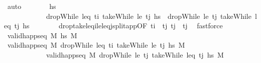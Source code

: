 \begin{isabellebody}
\ auto\isanewline
\ \ \ \ \isamarkupfalse%
\ \isamarkupfalse%
\ {\isachardoublequoteopen}{\isacharquery}{\kern0pt}hs{\isacharprime}{\kern0pt}\ \isanewline
\ \ \ \ \ \ \ \ \ \ \ {\isacharequal}{\kern0pt}\ dropWhile\ {\isacharparenleft}{\kern0pt}leq\ t\isactrlsub i{\isacharparenright}{\kern0pt}\ {\isacharparenleft}{\kern0pt}takeWhile\ {\isacharparenleft}{\kern0pt}le\ t\isactrlsub j{\isacharparenright}{\kern0pt}\ hs{\isacharparenright}{\kern0pt}\ {\isacharat}{\kern0pt}\ dropWhile\ {\isacharparenleft}{\kern0pt}le\ t\isactrlsub j{\isacharparenright}{\kern0pt}\ {\isacharparenleft}{\kern0pt}takeWhile\ {\isacharparenleft}{\kern0pt}leq\ t\isactrlsub j{\isacharparenright}{\kern0pt}\ hs{\isacharparenright}{\kern0pt}{\isachardoublequoteclose}\isanewline
\ \ \ \ \ \ \isamarkupfalse%
\ drop{\isacharunderscore}{\kern0pt}take{\isacharunderscore}{\kern0pt}leq\isactrlsub i{\isacharunderscore}{\kern0pt}le{\isacharunderscore}{\kern0pt}leq\isactrlsub j{\isacharunderscore}{\kern0pt}split{\isacharunderscore}{\kern0pt}app{\isacharbrackleft}{\kern0pt}OF\ {\isacartoucheopen}t\isactrlsub i\ {\isacharless}{\kern0pt}\ t\isactrlsub j{\isacartoucheclose}\ {\isacartoucheopen}t\isactrlsub j\ {\isasymle}\ t\isactrlsub j{\isacartoucheclose}{\isacharbrackright}{\kern0pt}\ \isamarkupfalse%
\ fastforce\isanewline
\ \ \ \ \isamarkupfalse%
\ \isamarkupfalse%
\ {\isachardoublequoteopen}valid{\isacharunderscore}{\kern0pt}happ{\isacharunderscore}{\kern0pt}seq\ M\ {\isacharquery}{\kern0pt}hs{\isacharprime}{\kern0pt}\ M{\isacharprime}{\kern0pt}{\isachardoublequoteclose}\isanewline
\ \ \ \ \ \ \isamarkupfalse%
\ {\isacartoucheopen}valid{\isacharunderscore}{\kern0pt}happ{\isacharunderscore}{\kern0pt}seq\ M\ {\isacharparenleft}{\kern0pt}dropWhile\ {\isacharparenleft}{\kern0pt}leq\ t\isactrlsub i{\isacharparenright}{\kern0pt}\ {\isacharparenleft}{\kern0pt}takeWhile\ {\isacharparenleft}{\kern0pt}le\ t\isactrlsub j{\isacharparenright}{\kern0pt}\ hs{\isacharparenright}{\kern0pt}{\isacharparenright}{\kern0pt}\ M{\isacartoucheclose}\ \isanewline
\ \ \ \ \ \ \ \ \ \ \ \ {\isacartoucheopen}valid{\isacharunderscore}{\kern0pt}happ{\isacharunderscore}{\kern0pt}seq\ M\ {\isacharparenleft}{\kern0pt}dropWhile\ {\isacharparenleft}{\kern0pt}le\ t\isactrlsub j{\isacharparenright}{\kern0pt}\ {\isacharparenleft}{\kern0pt}takeWhile\ {\isacharparenleft}{\kern0pt}leq\ t\isactrlsub j{\isacharparenright}{\kern0pt}\ hs{\isacharparenright}{\kern0pt}{\isacharparenright}{\kern0pt}\ M{\isacharprime}{\kern0pt}{\isacartoucheclose}\isanewline

\end{isabellebody}
